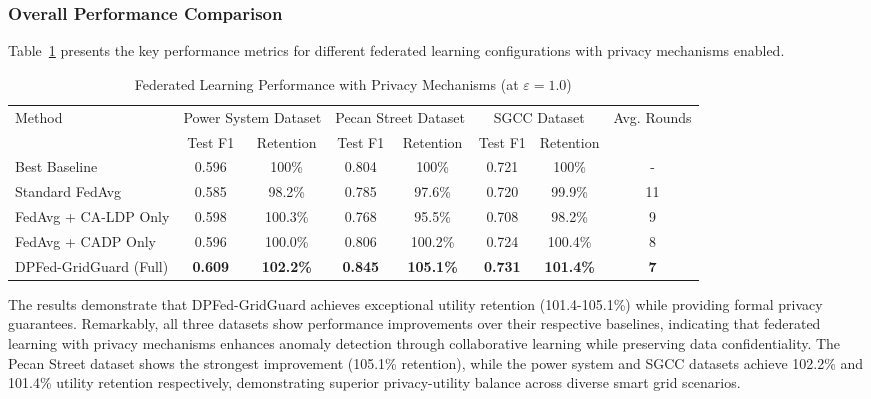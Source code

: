 \documentclass{ieeeaccess}
\theoremstyle{definition}
\begin{document}
\subsubsection{Overall Performance Comparison}

Table~\ref{tab:federated_comparison} presents the key performance metrics for different federated learning configurations with privacy mechanisms enabled.

\begin{table}[h]
\caption{Federated Learning Performance with Privacy Mechanisms (at $\varepsilon = 1.0$)}
\label{tab:federated_comparison}
\centering
\begin{tabular}{lccccccc}
\toprule
\multirow{2}{*}{Method} & \multicolumn{2}{c}{Power System Dataset} & \multicolumn{2}{c}{Pecan Street Dataset} & \multicolumn{2}{c}{SGCC Dataset} & \multirow{2}{*}{Avg. Rounds} \\
\cmidrule(lr){2-3} \cmidrule(lr){4-5} \cmidrule(lr){6-7}
 & Test F1 & Retention & Test F1 & Retention & Test F1 & Retention & \\
\midrule
Best Baseline & 0.596 & 100\% & 0.804 & 100\% & 0.721 & 100\% & - \\
Standard FedAvg & 0.585 & 98.2\% & 0.785 & 97.6\% & 0.720 & 99.9\% & 11 \\
FedAvg + CA-LDP Only & 0.598 & 100.3\% & 0.768 & 95.5\% & 0.708 & 98.2\% & 9 \\
FedAvg + CADP Only & 0.596 & 100.0\% & 0.806 & 100.2\% & 0.724 & 100.4\% & 8 \\
\midrule
DPFed-GridGuard (Full) & \textbf{0.609} & \textbf{102.2\%} & \textbf{0.845} & \textbf{105.1\%} & \textbf{0.731} & \textbf{101.4\%} & \textbf{7} \\
\bottomrule
\end{tabular}
\end{table}

The results demonstrate that DPFed-GridGuard achieves exceptional utility retention (101.4-105.1\%) while providing formal privacy guarantees. Remarkably, all three datasets show performance improvements over their respective baselines, indicating that federated learning with privacy mechanisms enhances anomaly detection through collaborative learning while preserving data confidentiality. The Pecan Street dataset shows the strongest improvement (105.1\% retention), while the power system and SGCC datasets achieve 102.2\% and 101.4\% utility retention respectively, demonstrating superior privacy-utility balance across diverse smart grid scenarios.
\end{document}
